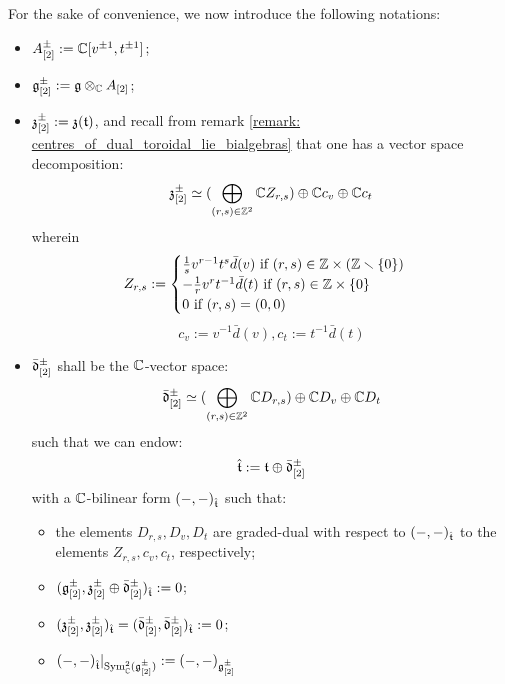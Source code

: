             \begin{convention} \label{conv: orthogonal_complement_of_toroidal_centres}
                For the sake of convenience, we now introduce the following notations:
                \begin{itemize}
                    \item $A_{[2]}^{\pm} := \mathbb{C}[v^{\pm 1}, t^{\pm 1}]$;
                    \item $\g_{[2]}^{\pm} := \g \tensor_{\bbC} A_{[2]}$;
                    \item $\mathfrak{z}_{[2]}^{\pm} := \mathfrak{z}(\mathfrak{t})$, and recall from remark \ref{remark: centres_of_dual_toroidal_lie_bialgebras} that one has a vector space decomposition:
                        $$\mathfrak{z}_{[2]}^{\pm} \simeq ( \bigoplus_{(r, s) \in \mathbb{Z}^2} \mathbb{C} Z_{r, s} ) \oplus \mathbb{C} c_v \oplus \mathbb{C} c_t$$
                    wherein
                        $$
                            Z_{r, s} :=
                            \begin{cases}
                                \text{$\frac1s v^{r - 1} t^s \bar{d}(v)$ if $(r, s) \in \Z \x (\Z \setminus \{0\})$}
                                \\
                                \text{$-\frac1r v^r t^{-1} \bar{d}(t)$ if $(r, s) \in \Z \x \{0\}$}
                                \\
                                \text{$0$ if $(r, s) = (0, 0)$}
                            \end{cases}
                        $$
                        $$c_v := v^{-1} \bar{d}(v), c_t := t^{-1} \bar{d}(t)$$
                    \item $\bar{\mathfrak{d}}_{[2]}^{\pm}$ shall be the $\mathbb{C}$-vector space:
                        $$\bar{\mathfrak{d}}_{[2]}^{\pm} \simeq ( \bigoplus_{(r, s) \in \mathbb{Z}^2} \mathbb{C} D_{r, s} ) \oplus \mathbb{C} D_v \oplus \mathbb{C} D_t$$
                    such that we can endow:
                        $$\hat{\mathfrak{t}} := \mathfrak{t} \oplus \bar{\mathfrak{d}}_{[2]}^{\pm}$$
                    with a $\mathbb{C}$-bilinear form $(-, -)_{\hat{\mathfrak{t}}}$ such that:
                    \begin{itemize}
                        \item the elements $D_{r, s}, D_v, D_t$ are graded-dual with respect to $(-, -)_{\hat{\mathfrak{t}}}$ to the elements $Z_{r, s}, c_v, c_t$, respectively;
                        \item $(\mathfrak{g}_{[2]}^{\pm}, \mathfrak{z}_{[2]}^{\pm} \oplus \bar{\mathfrak{d}}_{[2]}^{\pm})_{\hat{\mathfrak{t}}} := 0$;
                        \item $(\mathfrak{z}_{[2]}^{\pm}, \mathfrak{z}_{[2]}^{\pm})_{\hat{\mathfrak{t}}} = (\bar{\mathfrak{d}}_{[2]}^{\pm}, \bar{\mathfrak{d}}_{[2]}^{\pm})_{\hat{\mathfrak{t}}} := 0$;
                        \item $(-, -)_{\hat{\mathfrak{t}}}|_{\mathrm{Sym}^2_{\mathbb{C}}(\mathfrak{g}_{[2]}^{\pm})} := (-, -)_{\mathfrak{g}_{[2]}^{\pm}}$
                    \end{itemize}
                \end{itemize}
            \end{convention}
